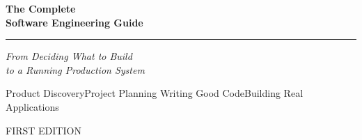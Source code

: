 \cleardoublepage
\thispagestyle{empty}
\begingroup
\centering
\vspace*{1.1in}
{\sffamily\bfseries\color{brand}\fontsize{30}{36}\selectfont The Complete\\[2pt]Software Engineering Guide\par}
\vspace{18pt}
{\color{accent}\rule{1.2in}{1pt}\par}
\vspace{16pt}
{\Large\itshape\color{muted}From Deciding What to Build\\to a Running Production System\par}
\vfill
{\small
  Product Discovery\enspace\textperiodcentered\enspace Project Planning\enspace\textperiodcentered\enspace
  Writing Good Code\enspace\textperiodcentered\enspace Building Real Applications\par}
\vspace{0.6in}
{\sffamily\footnotesize\color{muted}FIRST EDITION\par}
\vspace*{0.3in}
\endgroup
\clearpage
